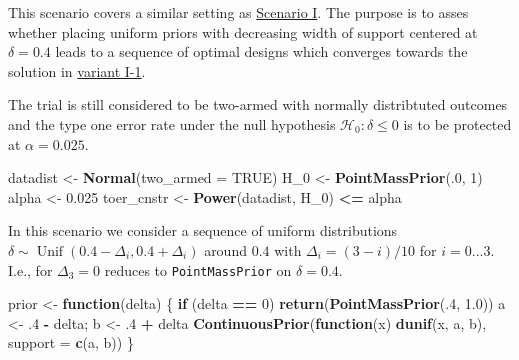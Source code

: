 \documentclass[
]{book}
\newenvironment{Shaded}{\begin{snugshade}}{\end{snugshade}}
\newcommand{\ControlFlowTok}[1]{\textcolor[rgb]{0.13,0.29,0.53}{\textbf{#1}}}
\newcommand{\DataTypeTok}[1]{\textcolor[rgb]{0.13,0.29,0.53}{#1}}
\newcommand{\DecValTok}[1]{\textcolor[rgb]{0.00,0.00,0.81}{#1}}
\newcommand{\FloatTok}[1]{\textcolor[rgb]{0.00,0.00,0.81}{#1}}
\newcommand{\KeywordTok}[1]{\textcolor[rgb]{0.13,0.29,0.53}{\textbf{#1}}}
\newcommand{\NormalTok}[1]{#1}
\newcommand{\OperatorTok}[1]{\textcolor[rgb]{0.81,0.36,0.00}{\textbf{#1}}}
\newcommand{\OtherTok}[1]{\textcolor[rgb]{0.56,0.35,0.01}{#1}}
\newcommand{\StringTok}[1]{\textcolor[rgb]{0.31,0.60,0.02}{#1}}
\begin{document}
This scenario covers a similar setting as \protect\hyperlink{scenarioI}{Scenario I}.
The purpose is to asses whether placing uniform priors with decreasing
width of support centered at \(\delta=0.4\) leads to a sequence of
optimal designs which converges towards the solution in \protect\hyperlink{variantI.1}{variant I-1}.

The trial is still considered to be two-armed with normally distribtuted outcomes
and the type one error rate under the null hypothesis
\(\mathcal{H}_0:\delta \leq 0\) is to be protected at \(\alpha = 0.025\).

\begin{Shaded}
\begin{Highlighting}[]
\NormalTok{datadist   <-}\StringTok{ }\KeywordTok{Normal}\NormalTok{(}\DataTypeTok{two_armed =} \OtherTok{TRUE}\NormalTok{)}
\NormalTok{H_}\DecValTok{0}\NormalTok{        <-}\StringTok{ }\KeywordTok{PointMassPrior}\NormalTok{(.}\DecValTok{0}\NormalTok{, }\DecValTok{1}\NormalTok{)}
\NormalTok{alpha      <-}\StringTok{ }\FloatTok{0.025}
\NormalTok{toer_cnstr <-}\StringTok{ }\KeywordTok{Power}\NormalTok{(datadist, H_}\DecValTok{0}\NormalTok{) }\OperatorTok{<=}\StringTok{ }\NormalTok{alpha}
\end{Highlighting}
\end{Shaded}

In this scenario we consider a sequence of uniform distributions
\(\delta\sim\operatorname{Unif}(0.4 - \Delta_i, 0.4 + \Delta_i)\)
around \(0.4\) with \(\Delta_i=(3 - i)/10\) for \(i=0\ldots 3\).
I.e., for \(\Delta_3=0\) reduces to \texttt{PointMassPrior} on \(\delta=0.4\).

\begin{Shaded}
\begin{Highlighting}[]
\NormalTok{prior <-}\StringTok{ }\ControlFlowTok{function}\NormalTok{(delta) \{}
    \ControlFlowTok{if}\NormalTok{ (delta }\OperatorTok{==}\StringTok{ }\DecValTok{0}\NormalTok{)}
        \KeywordTok{return}\NormalTok{(}\KeywordTok{PointMassPrior}\NormalTok{(.}\DecValTok{4}\NormalTok{, }\FloatTok{1.0}\NormalTok{))}
\NormalTok{    a <-}\StringTok{ }\FloatTok{.4} \OperatorTok{-}\StringTok{ }\NormalTok{delta; b <-}\StringTok{ }\FloatTok{.4} \OperatorTok{+}\StringTok{ }\NormalTok{delta}
    \KeywordTok{ContinuousPrior}\NormalTok{(}\ControlFlowTok{function}\NormalTok{(x) }\KeywordTok{dunif}\NormalTok{(x, a, b), }\DataTypeTok{support =} \KeywordTok{c}\NormalTok{(a, b))}
\NormalTok{\}}
\end{Highlighting}
\end{Shaded}
\end{document}
